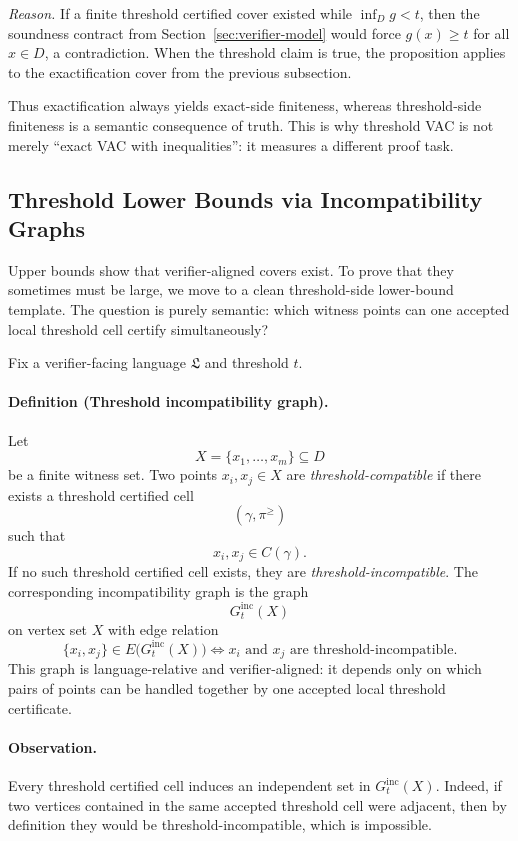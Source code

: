 \documentclass{article}
\begin{document}
\smallskip
\noindent\emph{Reason.}
If a finite threshold certified cover existed while $\inf_D g<t$, then the soundness contract from Section~\ref{sec:verifier-model} would force $g(x)\ge t$ for all $x\in D$, a contradiction. When the threshold claim is true, the proposition applies to the exactification cover from the previous subsection.

Thus exactification always yields exact-side finiteness, whereas threshold-side finiteness is a semantic consequence of truth. This is why threshold VAC is not merely ``exact VAC with inequalities'': it measures a different proof task.

\subsection{Threshold Lower Bounds via Incompatibility Graphs}

Upper bounds show that verifier-aligned covers exist. To prove that they sometimes must be large, we move to a clean threshold-side lower-bound template. The question is purely semantic: which witness points can one accepted local threshold cell certify simultaneously?

Fix a verifier-facing language $\mathfrak L$ and threshold $t$.

\paragraph{Definition (Threshold incompatibility graph).}
Let
\[
X=\{x_1,\dots,x_m\}\subseteq D
\]
be a finite witness set. Two points $x_i,x_j\in X$ are \emph{threshold-compatible} if there exists a threshold certified cell
\[
(\gamma,\pi^{\ge})
\]
such that
\[
x_i,x_j\in C(\gamma).
\]
If no such threshold certified cell exists, they are \emph{threshold-incompatible}. The corresponding incompatibility graph is the graph
\[
G_t^{\mathrm{inc}}(X)
\]
on vertex set $X$ with edge relation
\[
\{x_i,x_j\}\in E\bigl(G_t^{\mathrm{inc}}(X)\bigr)
\iff
x_i\text{ and }x_j\text{ are threshold-incompatible}.
\]
This graph is language-relative and verifier-aligned: it depends only on which pairs of points can be handled together by one accepted local threshold certificate.

\paragraph{Observation.}
Every threshold certified cell induces an independent set in $G_t^{\mathrm{inc}}(X)$. Indeed, if two vertices contained in the same accepted threshold cell were adjacent, then by definition they would be threshold-incompatible, which is impossible.
\end{document}
